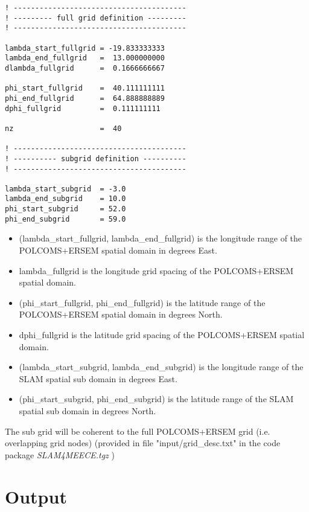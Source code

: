 {\small 
\begin{verbatim}
! ----------------------------------------
! --------- full grid definition ---------
! ----------------------------------------

lambda_start_fullgrid = -19.833333333
lambda_end_fullgrid   =  13.000000000
dlambda_fullgrid      =  0.1666666667

phi_start_fullgrid    =  40.111111111
phi_end_fullgrid      =  64.888888889
dphi_fullgrid         =  0.111111111

nz                    =  40 

! ----------------------------------------
! ---------- subgrid definition ----------
! ----------------------------------------

lambda_start_subgrid  = -3.0
lambda_end_subgrid    = 10.0
phi_start_subgrid     = 52.0
phi_end_subgrid       = 59.0
\end{verbatim}
}
\begin{itemize}
  \item (lambda\_start\_fullgrid, lambda\_end\_fullgrid) is the 
         longitude range of the POLCOMS+ERSEM spatial domain in degrees East.
  \item lambda\_fullgrid is the longitude grid spacing of the POLCOMS+ERSEM spatial domain.
  \item (phi\_start\_fullgrid, phi\_end\_fullgrid) is the 
         latitude range of the POLCOMS+ERSEM spatial domain in degrees North.
  \item dphi\_fullgrid is the latitude grid spacing of the POLCOMS+ERSEM spatial domain.

   \item (lambda\_start\_subgrid, lambda\_end\_subgrid) is the 
         longitude range of the SLAM spatial sub domain in degrees East.
  \item (phi\_start\_subgrid, phi\_end\_subgrid) is the 
         latitude range of the SLAM spatial sub domain in degrees North.
\end{itemize}
The sub grid will be coherent to the full POLCOMS+ERSEM grid (i.e. overlapping grid nodes)
(provided in file "input/grid\_desc.txt" in the code package {\it SLAM4MEECE.tgz}
)

\section{Output}

